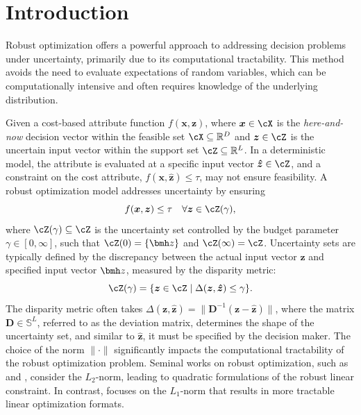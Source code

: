 \documentclass[opre, blindrev]{informs4}
\newcommand{\1}[1]{\mathds{1}{\left(#1\right)}}
\begin{document}

\maketitle

\section{Introduction}

Robust optimization offers a powerful approach to addressing decision problems under uncertainty, primarily due to its computational tractability. This method avoids the need to evaluate expectations of random variables, which can be computationally intensive and often requires knowledge of the underlying distribution.

Given a cost-based attribute function \( f(\bm x, \bm z) \), where \( \bm x \in \cX \) is the \emph{here-and-now} decision vector within the feasible set \( \cX \subseteq \mathbb{R}^D \) and \( \bm z \in \cZ \) is the uncertain input vector within the support set \( \cZ \subseteq \mathbb{R}^L \). In a deterministic model, the attribute is evaluated at a specific input vector \( \bm{\hat{z}} \in \cZ \), and a constraint on the cost attribute, \( f(\bm x, \bm{\hat{z}}) \leq \tau \), may not ensure feasibility. A robust optimization model addresses uncertainty by ensuring
\[ 
f(\bm x, \bm z) \leq \tau \quad \forall \bm z \in \cZ(\gamma), 
\]
where \( \cZ(\gamma) \subseteq \cZ \) is the uncertainty set controlled by the budget parameter \( \gamma \in [0, \infty] \), such that \( \cZ(0) = \{\bmh z\} \) and \( \cZ(\infty) = \cZ \). Uncertainty sets are typically defined by the discrepancy between the actual input vector $\bm z$ and specified input vector $\bmh z$, measured by the disparity metric:
$$
\cZ(\gamma) = \{ \bm z \in \cZ \;|\; \Delta(\bm z, \bm{\hat{z}}) \leq \gamma \}.
$$
The disparity metric often takes $\Delta(\bm z, \bm{\hat{z}}) = \|\mathbf{D}^{-1}(\bm z - \bm{\hat{z}})\|$, where the matrix \( \mathbf{D} \in \mathbb{S}^L \), referred to as the deviation matrix, determines the shape of the uncertainty set, and similar to \( \bm{\hat{z}} \), it must be specified by the decision maker. The choice of the norm \( \|\cdot\| \) significantly impacts the computational tractability of the robust optimization problem. Seminal works on robust optimization, such as \cite{ben1998robust} and \cite{el1998robust}, consider the \( L_2 \)-norm, leading to quadratic formulations of the robust linear constraint. In contrast, \cite{bertsimas2004price} focuses on the \( L_1 \)-norm that results in more tractable linear optimization formats. 
\end{document}
